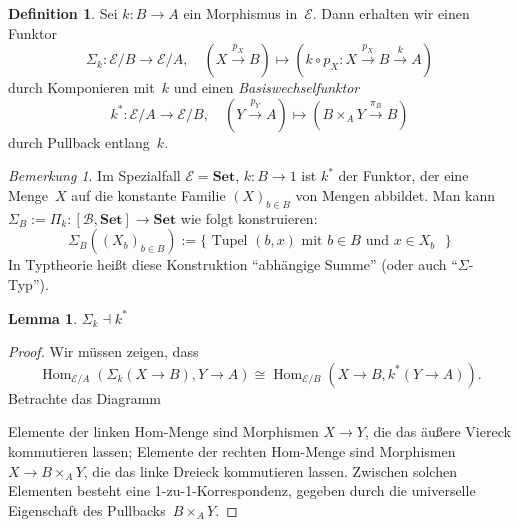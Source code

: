 \documentclass{article}
\theoremstyle{definition}
\newtheorem*{defn}{Definition}
\newtheorem*{lem}{Lemma}
\theoremstyle{remark}
\newtheorem*{bem}{Bemerkung}
\newcommand{\coloneqq}{:=} %
\newcommand{\?}{\,{:}\,}
\renewcommand{\_}{\mathpunct{.}\,}
\DeclareMathOperator{\Hom}{Hom} %
\newcommand{\ladj}{\dashv} %
\newcommand{\SetC}{\mathbf{Set}} %
\newcommand{\FuncC}[2]{[{#1}, {#2}]} %
\newcommand{\Bat}{\mathcal{B}} %
\newcommand{\Eat}{\mathcal{E}} %
\begin{document}
\begin{defn}
  Sei $k : B \to A$ ein Morphismus in~$\Eat$.
  Dann erhalten wir einen Funktor
  \[
    \Sigma_k : \Eat/B \to \Eat/A, \quad
    (X \xrightarrow{p_X} B) \mapsto (k \circ p_X : X \xrightarrow{p_X} B \xrightarrow{k} A)
  \]
  durch Komponieren mit~$k$ und einen \emph{Basiswechselfunktor}
  \[
    k^* : \Eat/A \to \Eat/B, \quad
    (Y \xrightarrow{p_Y} A) \mapsto (B \times_A Y \xrightarrow{\pi_B} B)
  \]
  durch Pullback entlang~$k$.
\end{defn}

\begin{bem}
  Im Spezialfall $\Eat = \SetC$, $k : B \to 1$ ist $k^*$ der Funktor, der eine Menge~$X$ auf die konstante Familie $(X)_{b \in B}$ von Mengen abbildet.
  Man kann $\Sigma_B \coloneqq \Pi_k : \FuncC{\Bat}{\SetC} \to \SetC$ wie folgt konstruieren:
  \[
    \Sigma_B((X_b)_{b \in B}) \coloneqq \{ \text{ Tupel $(b, x)$ mit $b \in B$ und $x \in X_b$ } \}
  \]
  In Typtheorie heißt diese Konstruktion "`abhängige Summe"' (oder auch "`$\Sigma$-Typ"').
\end{bem}

\begin{lem}
  $\Sigma_k \ladj k^*$
\end{lem}

\begin{proof}
Wir müssen zeigen, dass
\[
  \Hom_{\Eat/A}(\Sigma_k(X \to B), Y \to A) \cong \Hom_{\Eat/B}(X \to B, k^*(Y \to A)).
\]
Betrachte das Diagramm
\begin{center}\end{center}
Elemente der linken Hom-Menge sind Morphismen $X \to Y$, die das äußere Viereck kommutieren lassen; Elemente der rechten Hom-Menge sind Morphismen $X \to B \times_A Y$, die das linke Dreieck kommutieren lassen.
Zwischen solchen Elementen besteht eine 1-zu-1-Korrespondenz, gegeben durch die universelle Eigenschaft des Pullbacks~$B \times_A Y$.
\end{proof}
\end{document}

